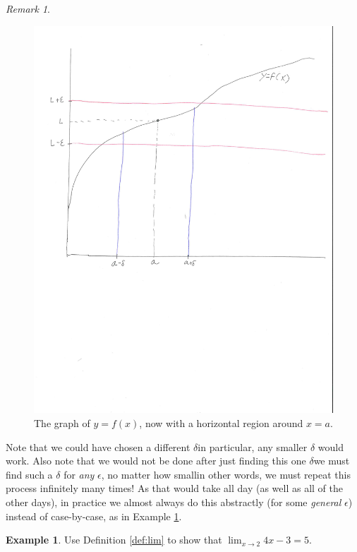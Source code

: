 \documentclass[english]{book}
\theoremstyle{remark}
\newtheorem{remark}{Remark}[theorem]
\theoremstyle{definition}
\newtheorem{exle}[theorem]{Example}
\newtheorem*{next week}{Next Week}
\begin{document}
\begin{remark}
\begin{figure}[h!]\centering
	\includegraphics[scale=0.5,trim={0 4in 10mm 0},clip]{1graph3} \caption{The graph of $y=f(x)$, now with a horizontal region around $x=a$.\label{fig:1graph3}}
\end{figure}

Note that we could have chosen a different $\delta$\textemdash in particular, any smaller $\delta$ would work. Also note that we would not be done after just finding this one $\delta$\textemdash we must find such a $\delta$ for \emph{any} $\epsilon$, no matter how small\textemdash in other words, we must repeat this process infinitely many times! As that would take all day (as well as all of the other days), in practice we almost always do this abstractly (for some \emph{general} $\epsilon$) instead of case-by-case, as in Example \ref{ex:1lin}.
\end{remark}
\begin{exle}\label{ex:1lin}
	Use Definition \ref{def:lim} to show that $\displaystyle\lim_{x\to 2} 4x-3=5$.
\end{exle}
\end{document}
